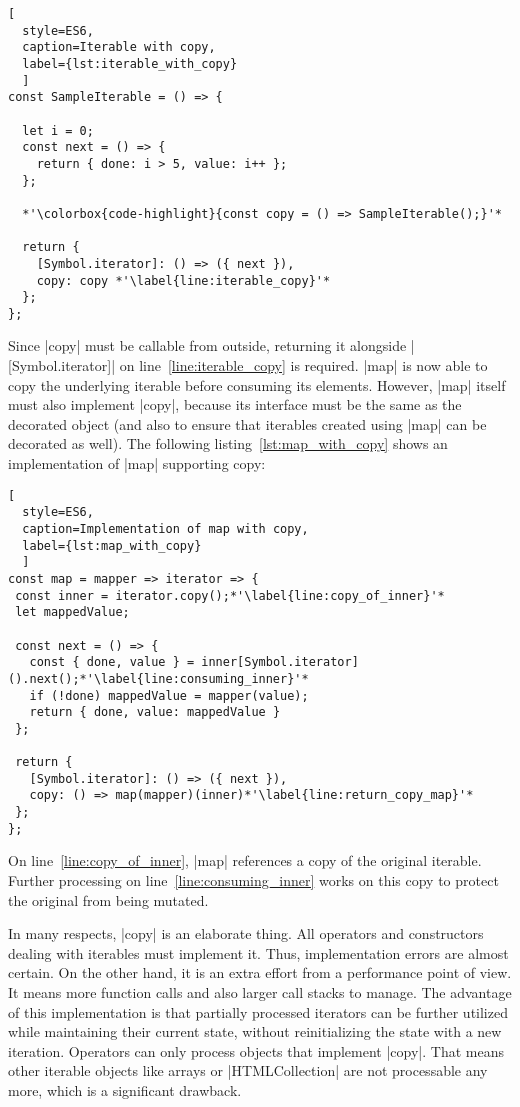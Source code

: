 \begin{lstlisting}[
  style=ES6, 
  caption=Iterable with copy,
  label={lst:iterable_with_copy}
  ]
const SampleIterable = () => {

  let i = 0;
  const next = () => {
    return { done: i > 5, value: i++ };
  };

  *'\colorbox{code-highlight}{const copy = () => SampleIterable();}'*

  return {
    [Symbol.iterator]: () => ({ next }),
    copy: copy *'\label{line:iterable_copy}'*
  };
};
\end{lstlisting}
Since |copy| must be callable from outside, returning it alongside 
|[Symbol.iterator]| on line~\ref{line:iterable_copy} is required. |map| is now
able to copy the underlying  iterable before consuming its elements.
However, |map| itself must also implement |copy|, because its interface must be
the same as the decorated object (and also to ensure that iterables created
using |map| can be decorated as well). The following listing~\ref{lst:map_with_copy} 
shows an implementation of |map| supporting copy:

\begin{lstlisting}[
  style=ES6, 
  caption=Implementation of map with copy,
  label={lst:map_with_copy}
  ]
const map = mapper => iterator => {
 const inner = iterator.copy();*'\label{line:copy_of_inner}'*
 let mappedValue;

 const next = () => {
   const { done, value } = inner[Symbol.iterator]().next();*'\label{line:consuming_inner}'*
   if (!done) mappedValue = mapper(value);
   return { done, value: mappedValue }
 };

 return {
   [Symbol.iterator]: () => ({ next }),
   copy: () => map(mapper)(inner)*'\label{line:return_copy_map}'* 
 };
};
\end{lstlisting}
On line~\ref{line:copy_of_inner}, |map| references a copy of the original
iterable. Further processing on line~\ref{line:consuming_inner} works on this 
copy to protect the original from being mutated.

In many respects, |copy| is an elaborate thing. All operators and constructors 
dealing with iterables must implement it. Thus, implementation errors are 
almost certain. On the other hand, it is an extra effort from a performance point 
of view. It means more function calls and also larger call stacks to manage.
The advantage of this implementation is that partially processed iterators can
be further utilized while maintaining their current state, without
reinitializing the state with a new iteration.
Operators can only process objects that implement |copy|. That means other
iterable objects like arrays or |HTMLCollection| are not processable any more,
which is a significant drawback.

